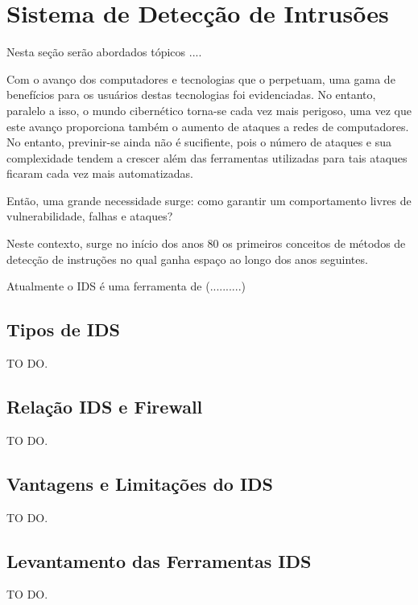 \chapter{Sistema de Detecção de Intrusões}
\label{chap:IDS}
	
	Nesta seção serão abordados tópicos ....

	Com o avanço dos computadores e tecnologias que o perpetuam, uma gama de benefícios para os usuários destas tecnologias foi evidenciadas. No entanto, paralelo a isso, o mundo cibernético torna-se cada vez mais perigoso, uma vez que este avanço proporciona também o aumento de ataques a redes de computadores. No entanto, previnir-se ainda não é sucifiente, pois o número de ataques e sua complexidade tendem a crescer além das ferramentas utilizadas para tais ataques ficaram cada vez mais automatizadas.

	Então, uma grande necessidade surge: como garantir um comportamento livres de vulnerabilidade, falhas e ataques?

	Neste contexto, surge no início dos anos 80 os primeiros conceitos de métodos de detecção de instruções no qual ganha espaço ao longo dos anos seguintes.

	Atualmente o IDS é uma ferramenta de (..........)


	\section{Tipos de IDS}
	\label{sec:IDS_Tipos}

		TO DO.

	\section{Relação IDS e Firewall}
	\label{sec:IDS_Firewall}

		TO DO.

	\section{Vantagens e Limitações do IDS}
	\label{sec:IDS_VeL}

		TO DO.

	\section{Levantamento das Ferramentas IDS}
	\label{sec:IDS_Ferramentas}

		TO DO.


